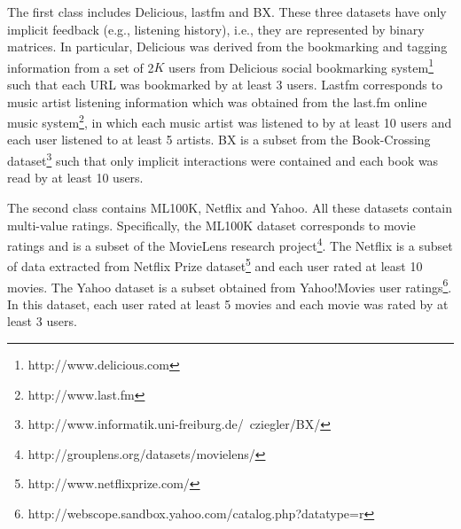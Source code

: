 \documentclass[letterpaper]{article}
\begin{document}
The first class includes Delicious, lastfm and BX. These three datasets have only implicit feedback (e.g., listening history), i.e., they are represented by binary matrices. In particular, Delicious was derived from the bookmarking and tagging information from a set of 2$K$ users from Delicious social bookmarking system\footnote{http://www.delicious.com} such that each URL was bookmarked by at least 3 users. Lastfm corresponds to music artist listening information which was obtained from the last.fm online music system\footnote{ http://www.last.fm }, in which each music artist was listened to by at least 10 users and each user listened to at least 5 artists. BX is a subset from the Book-Crossing dataset\footnote{http://www.informatik.uni-freiburg.de/~cziegler/BX/} such that only implicit interactions were contained and each book was read by at least 10 users.

The second class contains ML100K, Netflix and Yahoo. All these datasets contain multi-value ratings. Specifically, the ML100K dataset corresponds to movie ratings and is a subset of the MovieLens research project\footnote{http://grouplens.org/datasets/movielens/}. The Netflix is a subset of data extracted from Netflix Prize dataset\footnote{http://www.netflixprize.com/} and each user rated at least 10 movies. The Yahoo dataset is a subset obtained from Yahoo!Movies user ratings\footnote{http://webscope.sandbox.yahoo.com/catalog.php?datatype=r}. In this dataset, each user rated at least 5 movies and each movie was rated by at least 3 users.
\end{document}
